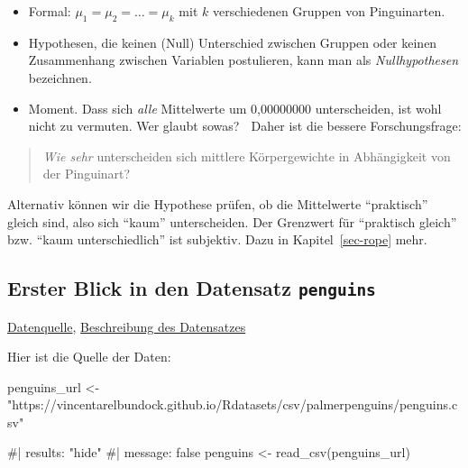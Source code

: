 \documentclass[
  a4paper,
  DIV=11]{scrreprt}
\newenvironment{Shaded}{\begin{snugshade}}{\end{snugshade}}
\newcommand{\CommentTok}[1]{\textcolor[rgb]{0.37,0.37,0.37}{#1}}
\newcommand{\FunctionTok}[1]{\textcolor[rgb]{0.28,0.35,0.67}{#1}}
\newcommand{\NormalTok}[1]{\textcolor[rgb]{0.00,0.23,0.31}{#1}}
\newcommand{\OtherTok}[1]{\textcolor[rgb]{0.00,0.23,0.31}{#1}}
\newcommand{\StringTok}[1]{\textcolor[rgb]{0.13,0.47,0.30}{#1}}
\theoremstyle{definition}
\theoremstyle{remark}
\begin{document}
\begin{itemize}
\item
  Formal: \(\mu_1 = \mu_2 = \ldots = \mu_k\) mit \(k\) verschiedenen
  Gruppen von Pinguinarten.
\item
  Hypothesen, die keinen (Null) Unterschied zwischen Gruppen oder keinen
  Zusammenhang zwischen Variablen postulieren, kann man als
  \emph{Nullhypothesen} bezeichnen.
\item
  Moment. Dass sich \emph{alle} Mittelwerte um 0,00000000 unterscheiden,
  ist wohl nicht zu vermuten. Wer glaubt sowas? 🤔 Daher ist die bessere
  Forschungsfrage:
\end{itemize}

\begin{quote}
\emph{Wie sehr} unterscheiden sich mittlere Körpergewichte in
Abhängigkeit von der Pinguinart?
\end{quote}

Alternativ können wir die Hypothese prüfen, ob die Mittelwerte
``praktisch'' gleich sind, also sich ``kaum'' unterscheiden. Der
Grenzwert für ``praktisch gleich'' bzw. ``kaum unterschiedlich'' ist
subjektiv. Dazu in Kapitel~\ref{sec-rope} mehr.

\hypertarget{erster-blick-in-den-datensatz-penguins}{%
\subsection{\texorpdfstring{Erster Blick in den Datensatz
\texttt{penguins}}{Erster Blick in den Datensatz penguins}}\label{erster-blick-in-den-datensatz-penguins}}

\href{https://vincentarelbundock.github.io/Rdatasets/csv/palmerpenguins/penguins.csv}{Datenquelle},
\href{https://vincentarelbundock.github.io/Rdatasets/doc/palmerpenguins/penguins.html}{Beschreibung
des Datensatzes}

Hier ist die Quelle der Daten:

\begin{Shaded}
\begin{Highlighting}[]
\NormalTok{penguins\_url }\OtherTok{\textless{}{-}} \StringTok{"https://vincentarelbundock.github.io/Rdatasets/csv/palmerpenguins/penguins.csv"}

\CommentTok{\#| results: "hide"}
\CommentTok{\#| message: false}
\NormalTok{penguins }\OtherTok{\textless{}{-}} 
  \FunctionTok{read\_csv}\NormalTok{(penguins\_url)}
\end{Highlighting}
\end{Shaded}
\end{document}
